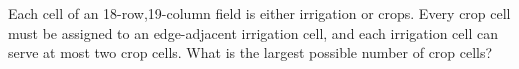 Each cell of an 18-row,19-column field is either irrigation or crops. Every crop cell must be assigned to an edge-adjacent irrigation cell, and each irrigation cell can serve at most two crop cells. What is the largest possible number of crop cells?
